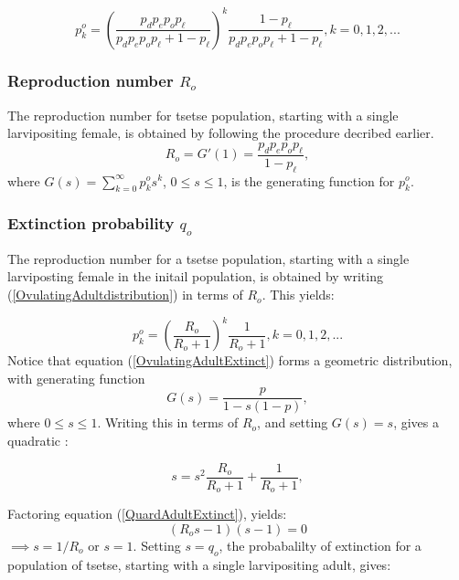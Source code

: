 \documentclass[smallextended]{svjour3}
\begin{document}
\begin{equation}
\label{OvulatingAdultdistribution}
p_{k}^{o} = (\frac{p_{d}p_{e}p_{o}p_{\ell}}{p_{d}p_{e}p_{o}p_{\ell} + 1 - p_{\ell}})^{k}\frac{1 - p_{\ell}}{p_{d}p_{e}p_{o}p_{\ell} + 1 - p_{\ell}}, k =0,1,2,...
\end{equation}




\subsubsection{Reproduction number $R_{o}$}
The reproduction number for tsetse population, starting with a single larvipositing female, is obtained by following the procedure decribed earlier. 
\begin{equation}
\label{OvulatingadultreproductiveNum}
R_{o} = G'(1) = \frac{p_{d}p_{e}p_{o}p_{\ell}}{1-p_{\ell}},
\end{equation}  
where $G(s) = \sum_{k=0}^{\infty} p_{k}^{o}s^{k}  $, $0\leq s \leq 1$, is the generating function for $p_{k}^{o}$.

\subsubsection{Extinction probability  $q_{o}$}

The reproduction number for a tsetse population, starting with a single larviposting female in the initail population, is obtained by writing  (\ref{OvulatingAdultdistribution}) in terms of  $R_{o}$. This yields:

\begin{equation}
\label{OvulatingAdultExtinct}
p_{k}^{o} = (\frac{R_{o}}{R_{o} + 1})^k\frac{1}{R_{o} + 1}, k =0,1,2,...
\end{equation}
Notice that equation (\ref{OvulatingAdultExtinct}) forms a geometric distribution, with generating function  $$G(s) = \frac{p}{1-s(1-p)}, $$ where $0\leq s \leq 1$. Writing this in terms of $R_o$, and setting $G(s)=s$, gives a quadratic :

\begin{equation}
\label{QuardAdultExtinct}
s =s^2\frac{R_{o}}{R_{o} + 1} + \frac{1}{R_{o} + 1} ,
\end{equation} 

Factoring equation (\ref{QuardAdultExtinct}), yields:
 $$(R_os-1)(s-1) = 0$$ $\implies s=1/R_o$ or $s=1$. Setting $s=q_o$,  the probabalilty of extinction for a population of tsetse, starting with a single larvipositing adult, gives: 
\end{document}
